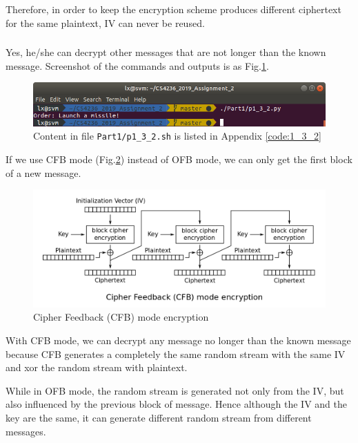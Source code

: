 Therefore, in order to keep the encryption scheme produces different ciphertext for the same plaintext, IV can never be reused.

\subsubsection{}
Yes, he/she can decrypt other messages that are not longer than the known message. Screenshot of the commands and outputs is as Fig.\ref{fig:p1_3_2}.

\begin{figure}[t!]
\centering
\includegraphics[width=\columnwidth]{pictures/p1_3_2.png}
\caption{
    Content in file \texttt{Part1/p1\_3\_2.sh} is listed in Appendix \ref{code:1_3_2}
}
\label{fig:p1_3_2}
\end{figure}

If we use CFB mode (Fig.\ref{fig:CFB_encryption}) instead of OFB mode, we can only get the first block of a new message.

\begin{figure}[ht]
\centering
\includegraphics[width=\columnwidth]{pictures/CFB_encryption.png}
\caption{
    Cipher Feedback (CFB) mode encryption \protect\footnotemark
}
\label{fig:CFB_encryption}
\end{figure}


With CFB mode, we can decrypt any message no longer than the known message because CFB generates a completely the same random stream with the same IV and xor the random stream with plaintext.

While in OFB mode, the random stream is generated not only from the IV, but also influenced by the previous block of message. Hence although the IV and the key are the same, it can generate different random stream from different messages.

